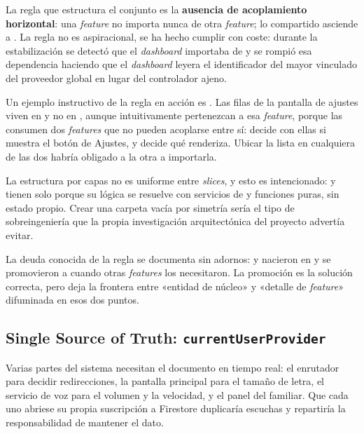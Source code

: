 La regla que estructura el conjunto es la \textbf{ausencia de acoplamiento horizontal}: una \emph{feature}
no importa nunca de otra \emph{feature}; lo compartido asciende a . La regla no es
aspiracional, se ha hecho cumplir con coste: durante la estabilización se detectó que el \emph{dashboard}
importaba de  y se rompió esa dependencia haciendo que el \emph{dashboard} leyera el
identificador del mayor vinculado del proveedor global en lugar del controlador ajeno.

Un ejemplo instructivo de la regla en acción es . Las filas de la pantalla de
ajustes viven en  y no en , aunque intuitivamente pertenezcan
a esa \emph{feature}, porque las consumen dos \emph{features} que no pueden acoplarse entre sí:
 decide con ellas si muestra el botón de Ajustes, y  decide qué
renderiza. Ubicar la lista en cualquiera de las dos habría obligado a la otra a importarla.

La estructura por capas no es uniforme entre \emph{slices}, y esto es intencionado:  y
 tienen solo  porque su lógica se resuelve con servicios de 
y funciones puras, sin estado propio. Crear una carpeta  vacía por simetría sería el tipo de
sobreingeniería que la propia investigación arquitectónica del proyecto advertía evitar.

La deuda conocida de la regla se documenta sin adornos:  y
 nacieron en  y se promovieron a  cuando otras
\emph{features} los necesitaron. La promoción es la solución correcta, pero deja la frontera entre
«entidad de núcleo» y «detalle de \emph{feature}» difuminada en esos dos puntos.

\subsection{Single Source of Truth: \texttt{currentUserProvider}}
\label{sec:ssot}

Varias partes del sistema necesitan el documento  en tiempo real: el enrutador para
decidir redirecciones, la pantalla principal para el tamaño de letra, el servicio de voz para el volumen y
la velocidad, y el panel del familiar. Que cada uno abriese su propia suscripción a Firestore duplicaría
escuchas y repartiría la responsabilidad de mantener el dato.

